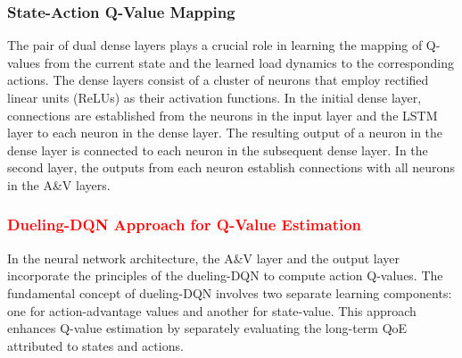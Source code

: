 \documentclass[10pt, journal,letterpaper]{IEEEtran}
\begin{document}
%



\subsubsection{State-Action Q-Value Mapping}
The pair of dual dense layers plays a crucial role in learning the mapping of Q-values from the current state and the learned load dynamics to the corresponding actions. The dense layers consist of a cluster of neurons that employ rectified linear units (ReLUs) as their activation functions. In the initial dense layer, connections are established from the neurons in the input layer and the LSTM layer to each neuron in the dense layer. The resulting output of a neuron in the dense layer is connected to each neuron in the subsequent dense layer. In the second layer, the outputs from each neuron establish connections with all neurons in the A\&V layers.



\subsubsection{\textcolor{red}{Dueling-DQN Approach for Q-Value Estimation}}
In the neural network architecture, the A\&V layer and the output layer incorporate the principles of the dueling-DQN \cite{wang2016dueling} to compute action Q-values. The fundamental concept of dueling-DQN involves two separate learning components: one for action-advantage values and another for state-value. This approach enhances Q-value estimation by separately evaluating the long-term QoE attributed to states and actions.
\end{document}
